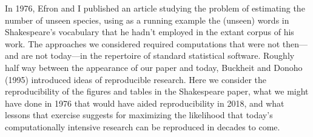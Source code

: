 In 1976, Efron and I published an article studying the problem of estimating the number of unseen species, using as a running example the (unseen) words in Shakespeare's vocabulary that he hadn't employed in the extant corpus of his work.  The approaches we considered required computations that were not then---and are not today---in the repertoire of standard statistical software.  Roughly half way between the appearance of our paper and today, Buckheit and Donoho (1995) introduced ideas of reproducible research.  Here we consider the reproducibility of the figures and tables in the Shakespeare paper, what we might have done in 1976 that would have aided reproducibility in 2018, and what lessons that exercise suggests for maximizing the likelihood that today's computationally intensive research can be reproduced in decades to come.
